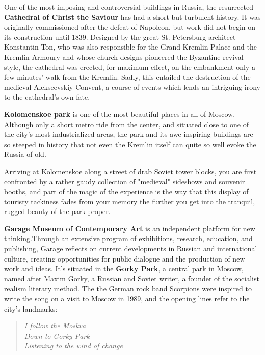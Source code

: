 \documentclass[10pt,fleqn,openany]{book} %
\begin{document}
	
	One of the most imposing and controversial buildings in Russia, the resurrected \textbf{Cathedral of Christ the Saviour} has had a short but turbulent history. It was originally commissioned after the defeat of Napoleon, but work did not begin on its construction until 1839. Designed by the great St. Petersburg architect Konstantin Ton, who was also responsible for the Grand Kremlin Palace and the Kremlin Armoury and whose church designs pioneered the Byzantine-revival style, the cathedral was erected, for maximum effect, on the embankment only a few minutes' walk from the Kremlin. Sadly, this entailed the destruction of the medieval Alekseevskiy Convent, a course of events which lends an intriguing irony to the cathedral's own fate.
	
	
	\textbf{Kolomenskoe park} is one of the most beautiful places in all of Moscow. Although only a short metro ride from the center, and situated close to one of the city's most industrialized areas, the park and its awe-inspiring buildings are so steeped in history that not even the Kremlin itself can quite so well evoke the Russia of old.
	
	
	Arriving at Kolomenskoe along a street of drab Soviet tower blocks, you are first confronted by a rather gaudy collection of "medieval" sideshows and souvenir booths, and part of the magic of the experience is the way that this display of touristy tackiness fades from your memory the further you get into the tranquil, rugged beauty of the park proper.
	
	
	\textbf{Garage Museum of Contemporary Art} is an independent platform for new thinking.Through an extensive program of exhibitions, research, education, and publishing, Garage reflects on current developments in Russian and international culture, creating opportunities for public dialogue and the production of new work and ideas.
	It’s situated in the \textbf{Gorky Park}, a central park in Moscow, named after Maxim Gorky, a Russian and Soviet writer, a founder of the socialist realism literary method. 
	The the German rock band Scorpions were inspired to write the song on a visit to Moscow in 1989, and the opening lines refer to the city's landmarks:
	\begin{quotation}
		\begin{center}
		\textit{I follow the Moskva\\
				Down to Gorky Park\\
				Listening to the wind of change}
		\end{center}
	\end{quotation}
	
\end{document}
